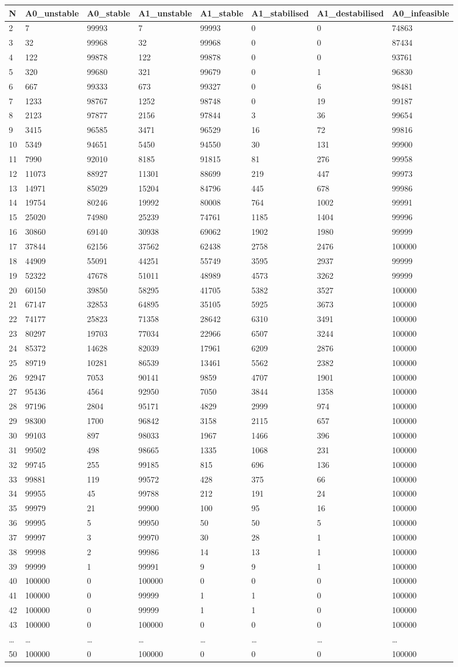 \documentclass[]{article}
\begin{document}
\begin{longtable}[]{@{}llllllll@{}}
\toprule
N & A0\_unstable & A0\_stable & A1\_unstable & A1\_stable &
A1\_stabilised & A1\_destabilised & A0\_infeasible\tabularnewline
\midrule
\endhead
2 & 7 & 99993 & 7 & 99993 & 0 & 0 & 74863\tabularnewline
3 & 32 & 99968 & 32 & 99968 & 0 & 0 & 87434\tabularnewline
4 & 122 & 99878 & 122 & 99878 & 0 & 0 & 93761\tabularnewline
5 & 320 & 99680 & 321 & 99679 & 0 & 1 & 96830\tabularnewline
6 & 667 & 99333 & 673 & 99327 & 0 & 6 & 98481\tabularnewline
7 & 1233 & 98767 & 1252 & 98748 & 0 & 19 & 99187\tabularnewline
8 & 2123 & 97877 & 2156 & 97844 & 3 & 36 & 99654\tabularnewline
9 & 3415 & 96585 & 3471 & 96529 & 16 & 72 & 99816\tabularnewline
10 & 5349 & 94651 & 5450 & 94550 & 30 & 131 & 99900\tabularnewline
11 & 7990 & 92010 & 8185 & 91815 & 81 & 276 & 99958\tabularnewline
12 & 11073 & 88927 & 11301 & 88699 & 219 & 447 & 99973\tabularnewline
13 & 14971 & 85029 & 15204 & 84796 & 445 & 678 & 99986\tabularnewline
14 & 19754 & 80246 & 19992 & 80008 & 764 & 1002 & 99991\tabularnewline
15 & 25020 & 74980 & 25239 & 74761 & 1185 & 1404 & 99996\tabularnewline
16 & 30860 & 69140 & 30938 & 69062 & 1902 & 1980 & 99999\tabularnewline
17 & 37844 & 62156 & 37562 & 62438 & 2758 & 2476 & 100000\tabularnewline
18 & 44909 & 55091 & 44251 & 55749 & 3595 & 2937 & 99999\tabularnewline
19 & 52322 & 47678 & 51011 & 48989 & 4573 & 3262 & 99999\tabularnewline
20 & 60150 & 39850 & 58295 & 41705 & 5382 & 3527 & 100000\tabularnewline
21 & 67147 & 32853 & 64895 & 35105 & 5925 & 3673 & 100000\tabularnewline
22 & 74177 & 25823 & 71358 & 28642 & 6310 & 3491 & 100000\tabularnewline
23 & 80297 & 19703 & 77034 & 22966 & 6507 & 3244 & 100000\tabularnewline
24 & 85372 & 14628 & 82039 & 17961 & 6209 & 2876 & 100000\tabularnewline
25 & 89719 & 10281 & 86539 & 13461 & 5562 & 2382 & 100000\tabularnewline
26 & 92947 & 7053 & 90141 & 9859 & 4707 & 1901 & 100000\tabularnewline
27 & 95436 & 4564 & 92950 & 7050 & 3844 & 1358 & 100000\tabularnewline
28 & 97196 & 2804 & 95171 & 4829 & 2999 & 974 & 100000\tabularnewline
29 & 98300 & 1700 & 96842 & 3158 & 2115 & 657 & 100000\tabularnewline
30 & 99103 & 897 & 98033 & 1967 & 1466 & 396 & 100000\tabularnewline
31 & 99502 & 498 & 98665 & 1335 & 1068 & 231 & 100000\tabularnewline
32 & 99745 & 255 & 99185 & 815 & 696 & 136 & 100000\tabularnewline
33 & 99881 & 119 & 99572 & 428 & 375 & 66 & 100000\tabularnewline
34 & 99955 & 45 & 99788 & 212 & 191 & 24 & 100000\tabularnewline
35 & 99979 & 21 & 99900 & 100 & 95 & 16 & 100000\tabularnewline
36 & 99995 & 5 & 99950 & 50 & 50 & 5 & 100000\tabularnewline
37 & 99997 & 3 & 99970 & 30 & 28 & 1 & 100000\tabularnewline
38 & 99998 & 2 & 99986 & 14 & 13 & 1 & 100000\tabularnewline
39 & 99999 & 1 & 99991 & 9 & 9 & 1 & 100000\tabularnewline
40 & 100000 & 0 & 100000 & 0 & 0 & 0 & 100000\tabularnewline
41 & 100000 & 0 & 99999 & 1 & 1 & 0 & 100000\tabularnewline
42 & 100000 & 0 & 99999 & 1 & 1 & 0 & 100000\tabularnewline
43 & 100000 & 0 & 100000 & 0 & 0 & 0 & 100000\tabularnewline
\ldots{} & \ldots{} & \ldots{} & \ldots{} & \ldots{} & \ldots{} &
\ldots{} & \ldots{}\tabularnewline
50 & 100000 & 0 & 100000 & 0 & 0 & 0 & 100000\tabularnewline
\bottomrule
\end{longtable}
\end{document}
